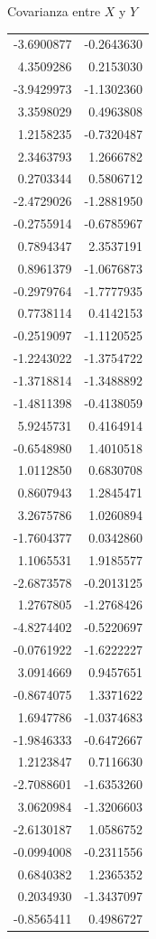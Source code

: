\documentclass[
  11pt,
  ignorenonframetext,
]{beamer}
\begin{document}
\begin{frame}{Covarianza entre \(X\) y \(Y\)}
\begin{longtable}[]{@{}rr@{}}
-3.6900877 & -0.2643630 \\
4.3509286 & 0.2153030 \\
-3.9429973 & -1.1302360 \\
3.3598029 & 0.4963808 \\
1.2158235 & -0.7320487 \\
2.3463793 & 1.2666782 \\
0.2703344 & 0.5806712 \\
-2.4729026 & -1.2881950 \\
-0.2755914 & -0.6785967 \\
0.7894347 & 2.3537191 \\
0.8961379 & -1.0676873 \\
-0.2979764 & -1.7777935 \\
0.7738114 & 0.4142153 \\
-0.2519097 & -1.1120525 \\
-1.2243022 & -1.3754722 \\
-1.3718814 & -1.3488892 \\
-1.4811398 & -0.4138059 \\
5.9245731 & 0.4164914 \\
-0.6548980 & 1.4010518 \\
1.0112850 & 0.6830708 \\
0.8607943 & 1.2845471 \\
3.2675786 & 1.0260894 \\
-1.7604377 & 0.0342860 \\
1.1065531 & 1.9185577 \\
-2.6873578 & -0.2013125 \\
1.2767805 & -1.2768426 \\
-4.8274402 & -0.5220697 \\
-0.0761922 & -1.6222227 \\
3.0914669 & 0.9457651 \\
-0.8674075 & 1.3371622 \\
1.6947786 & -1.0374683 \\
-1.9846333 & -0.6472667 \\
1.2123847 & 0.7116630 \\
-2.7088601 & -1.6353260 \\
3.0620984 & -1.3206603 \\
-2.6130187 & 1.0586752 \\
-0.0994008 & -0.2311556 \\
0.6840382 & 1.2365352 \\
0.2034930 & -1.3437097 \\
-0.8565411 & 0.4986727 \\

\end{longtable}
\end{frame}
\end{document}
